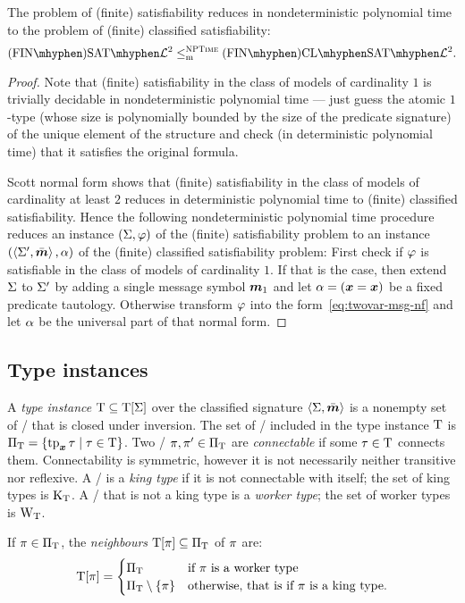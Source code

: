 \begin{remark}
The problem of (finite) satisfiability reduces in nondeterministic polynomial
time to the problem of (finite) classified satisfiability:
\[
  \FinASat{\vFo2} \red\cNP \FinAClSat{\vFo2}.
\]
\end{remark}
\begin{proof}

Note that (finite) satisfiability in the class of models of cardinality $1$ is
trivially decidable in nondeterministic polynomial time --- just guess the
atomic $1$-type (whose size is polynomially bounded by the size of the
predicate signature) of the unique element of the structure and check (in
deterministic polynomial time) that it satisfies the original formula.

Scott normal form shows that (finite) satisfiability in the class of models of
cardinality at least $2$ reduces in deterministic polynomial time to (finite)
classified satisfiability.
Hence the following nondeterministic polynomial time procedure reduces an
instance $(\mathrm{\Sigma}, \varphi)$ of the (finite) satisfiability problem to an instance
$(\left\langle \mathrm{\Sigma'},\bar{\bm{m}} \right\rangle, \alpha)$ of the (finite) classified satisfiability problem:
First check if $\varphi$ is satisfiable in the class of models of cardinality $1$.
If that is the case, then extend $\mathrm{\Sigma}$ to $\mathrm{\Sigma'}$ by adding a single message
symbol $\bm{m}_{1}$ and let $\alpha = (\bm{x} = \bm{x})$ be a fixed predicate tautology.
Otherwise transform $\varphi$ into the form~\cref{eq:twovar-msg-nf} and let
$\alpha$ be the universal part of that normal form.
\end{proof}

\subsection{Type instances}
A \emph{type instance} $\mathrm{T} \subseteq \mathrm{T}[\mathrm{\Sigma}]$ over the classified signature
$\left\langle \mathrm{\Sigma},\bar{\bm{m}} \right\rangle$ is a nonempty set of \twotypes/ that is closed under
inversion.
The set of \onetypes/ included in the type instance $\mathrm{T}$ is
${\Pi}_{\mathrm{T}} = \left\{\operatorname{tp}_{\bm{x}}\tau\mathrel{}\middle|\mathrel{}\tau\in\mathrm{T}\right\}$.
Two \onetypes/ $\pi,{\pi'} \in {\Pi}_{\mathrm{T}}$ are \emph{connectable} if some
$\tau\in\mathrm{T}$ connects them.
Connectability is symmetric, however it is not necessarily neither transitive
nor reflexive.
A \onetype/ is a \emph{king type} if it is not connectable with itself;
the set of king types is ${\mathrm{K}}_{\mathrm{T}}$.
A \onetype/ that is not a king type is a \emph{worker type};
the set of worker types is ${\mathrm{W}}_{\mathrm{T}}$.

If $\pi\in{\Pi}_{\mathrm{T}}$, the \emph{neighbours} $\mathrm{T}[\pi]\subseteq{\Pi}_{\mathrm{T}}$ of $\pi$
are:
\[
  \mathrm{T}[\pi] = \begin{cases}
    {\Pi}_{\mathrm{T}} &\text{if } \pi \text{ is a worker type} \\
    {\Pi}_{\mathrm{T}} \setminus \left\{\pi\right\} &\text{otherwise, that is if } \pi \text{ is a king
    type.}
  \end{cases}
\]

